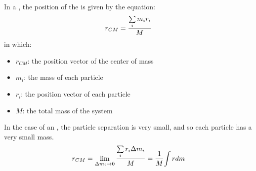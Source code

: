         \par In a , the position of the  is given
        by the equation:
        \begin{equation}
            r_{CM} = \dfrac{{\sum\limits _{i} m_{i}r_{i}}}{M}
        \end{equation}
        in which:
        \begin{itemize}
            \item $r_{CM}$: the position vector of the center of mass
            \item $m_{i}$: the mass of each particle
            \item $r_{i}$: the position vector of each particle
            \item $M$: the total mass of the system
        \end{itemize}
        \par In the case of an , the particle separation is very small, and
        so each particle has a very small mass.
        \begin{equation}
            r_{CM} = \lim_{\Delta m_{i} \to 0} \dfrac{{\sum\limits _{i} r_{i} \Delta m_{i}}}{M}
            = \dfrac{1}{M} {\int\limits rdm} \\
        \end{equation}

